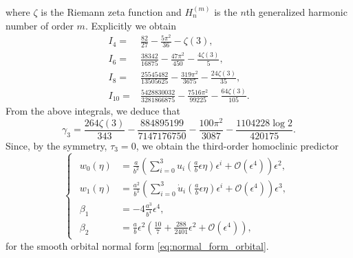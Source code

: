 where $\zeta$ is the Riemann zeta function and $H_n^{(m)}$ is the $n$th
generalized harmonic number of order $m$. Explicitly we obtain
\begin{align*}
    I_4 ={}& \frac{82}{27}-\frac{5 \pi ^2}{36}-\zeta (3), \\
    I_6 ={}& \frac{38342}{16875}-\frac{47 \pi ^2}{450}-\frac{4 \zeta (3)}{5}, \\
    I_8 ={}& \frac{25545482}{13505625}-\frac{319 \pi ^2}{3675}-\frac{24 \zeta (3)}{35}, \\
    I_{10} ={}& \frac{5428830032}{3281866875}-\frac{7516 \pi ^2}{99225}-\frac{64 \zeta (3)}{105}.
\end{align*}
From the above integrals, we deduce that
\begin{equation*}
    \gamma_3 = \frac{264 \zeta(3)}{343}-\frac{884895199}{7147176750}
            -\frac{100 \pi^2}{3087}-\frac{1104228 \log 2}{420175}.
\end{equation*}
Since, by the symmetry, $\tau_3=0$, we obtain the third-order homoclinic predictor 
\begin{equation}
\label{eq:third_order_predictor_RPM_tau}
\begin{cases}
\begin{aligned}
w_0(\eta)  &= \frac{a}{b^2} \left( \sum_{i=0}^3 u_i(\frac{a}{b}\epsilon\eta) \epsilon^i +
\mathcal{O}(\epsilon^4) \right)   \epsilon^2, \\
w_1(\eta)  &= \frac{a^2}{b^3} \left( \sum_{i=0}^3 \dot u_i(\frac{a}{b}\epsilon\eta) \epsilon^i +
\mathcal{O}(\epsilon^4) \right)   \epsilon^3, \\
\beta_1    &= -4 \frac{a^3}{b^4}\epsilon^4, \\
\beta_2    &= \frac{a}{b}\epsilon^2 \left( \frac{10}{7} + \frac{288}{2401} \epsilon^2 + \mathcal{O}(\epsilon^4) \right),
\end{aligned}
\end{cases}
\end{equation}
for the smooth orbital normal form \cref{eq:normal_form_orbital}.


